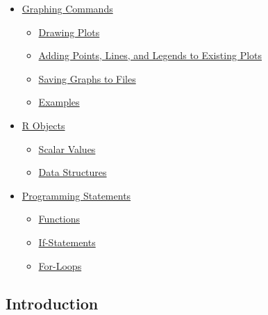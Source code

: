 \documentclass[letterpaper,10pt,english]{sphinxmanual}
\begin{document}
{\begin{minipage}{0.95\linewidth}
\begin{itemize}
\item {} 
{\hyperref[docs/user_guide:graphing-commands]{Graphing Commands}}
\begin{itemize}
\item {} 
{\hyperref[docs/user_guide:drawing-plots]{Drawing Plots}}

\item {} 
{\hyperref[docs/user_guide:adding-points-lines-and-legends-to-existing-plots]{Adding Points, Lines, and Legends to Existing Plots}}

\item {} 
{\hyperref[docs/user_guide:saving-graphs-to-files]{Saving Graphs to Files}}

\item {} 
{\hyperref[docs/user_guide:id17]{Examples}}

\end{itemize}

\item {} 
{\hyperref[docs/user_guide:r-objects]{R Objects}}
\begin{itemize}
\item {} 
{\hyperref[docs/user_guide:scalar-values]{Scalar Values}}

\item {} 
{\hyperref[docs/user_guide:id18]{Data Structures}}

\end{itemize}

\item {} 
{\hyperref[docs/user_guide:programming-statements]{Programming Statements}}
\begin{itemize}
\item {} 
{\hyperref[docs/user_guide:functions]{Functions}}

\item {} 
{\hyperref[docs/user_guide:if-statements]{If-Statements}}

\item {} 
{\hyperref[docs/user_guide:for-loops]{For-Loops}}

\end{itemize}

\end{itemize}
\end{minipage}}
\begin{center}\setlength{\fboxsep}{5pt}\end{center}


\subsection{Introduction}
\label{docs/user_guide:introduction}\label{docs/user_guide:userguide-introduction}
\end{document}
